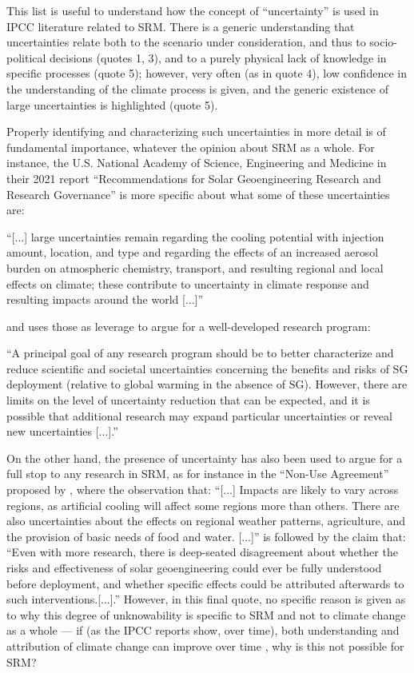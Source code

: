 \documentclass[draft]{agujournal2019}
\providecommand{\DIFadd}[1]{{\protect\color{blue}\uwave{#1}}} %
\providecommand{\DIFaddbegin}{} %
\providecommand{\DIFaddend}{} %
\begin{document}
This list is useful to understand how the concept of ``uncertainty'' is used in IPCC literature related to SRM. There is a generic understanding that uncertainties relate both to the \DIFaddbegin \DIFadd{background }\DIFaddend scenario under consideration, and thus to socio-political decisions (quotes 1, 3), and to a purely physical lack of knowledge in specific processes (quote 5); however, very often (as in quote 4), low confidence in the understanding of the climate process is given, and the generic existence of large uncertainties is highlighted (quote 5).

Properly identifying and characterizing such uncertainties in more detail is of fundamental importance, whatever the opinion about SRM as a whole. For instance, the U.S. National Academy of Science, Engineering and Medicine in their 2021 report ``Recommendations for Solar Geoengineering Research and Research Governance'' \cite{NASEM2021} is more specific about what some of these uncertainties are:

``[...] large uncertainties remain regarding the cooling potential with injection amount, location, and type and regarding the effects of an increased aerosol burden on atmospheric chemistry, transport, and resulting regional and local effects on climate; these contribute to uncertainty in climate response and resulting impacts around the world [...]''

and uses those as leverage to argue for a well-developed research program:

``A principal goal of any research program should be to better characterize and reduce scientific and societal uncertainties concerning the benefits and risks of SG deployment (relative to global warming in the absence of SG). However, there are limits on the level of uncertainty reduction that can be expected, and it is possible that additional research may expand particular uncertainties or reveal new uncertainties [...].''

On the other hand, the presence of uncertainty has also been used to argue for a full stop to any research in SRM, as for instance in the ``Non-Use Agreement'' proposed by , where the observation that: ``[...] Impacts are likely to vary across regions, as artificial cooling will affect some regions more than others. There are also uncertainties about the effects on regional weather patterns, agriculture, and the provision of basic needs of food and water. [...]'' is followed by the claim that: ``Even with more research, there is deep-seated disagreement about whether the risks and effectiveness of solar geoengineering could ever be fully understood before deployment, and whether specific effects could be attributed afterwards to such interventions.[...].'' However, in this final quote, no specific reason is given as to why this degree of unknowability is specific to SRM and not to climate change as a whole --- if (as the IPCC reports show, over time), both understanding and attribution of climate change can improve over time \cite{IPCC_2021_WGI}, why is this not possible for SRM?
\end{document}
